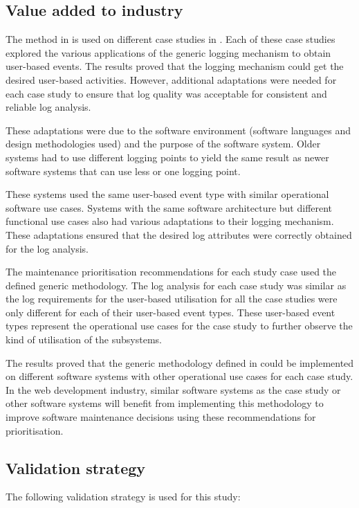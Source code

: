 \subsection{Value added to industry}
The method in  is used on different case studies in . Each of these case studies explored the various applications of the generic logging mechanism to obtain user-based events. The results proved that the logging mechanism could get the desired user-based activities. However, additional adaptations were needed for each case study to ensure that log quality was acceptable for consistent and reliable log analysis.\par These adaptations were due to the software environment (software languages and design methodologies used) and the purpose of the software system. Older systems had to use different logging points to yield the same result as newer software systems that can use less or one logging point.\par These systems used the same user-based event type with similar operational software use cases. Systems with the same software architecture but different functional use cases also had various adaptations to their logging mechanism. These adaptations ensured that the desired log attributes were correctly obtained for the log analysis. \par The maintenance prioritisation recommendations for each study case used the defined generic methodology. The log analysis for each case study was similar as the log requirements for the user-based utilisation for all the case studies were only different for each of their user-based event types. These user-based event types represent the operational use cases for the case study to further observe the kind of utilisation of the subsystems. \par The results proved that the generic methodology defined in  could be implemented on different software systems with other operational use cases for each case study. In the web development industry, similar software systems as the case study or other software systems will benefit from implementing this methodology to improve software maintenance decisions using these recommendations for prioritisation.

\subsection{Validation strategy}
The following validation strategy is used for this study:


